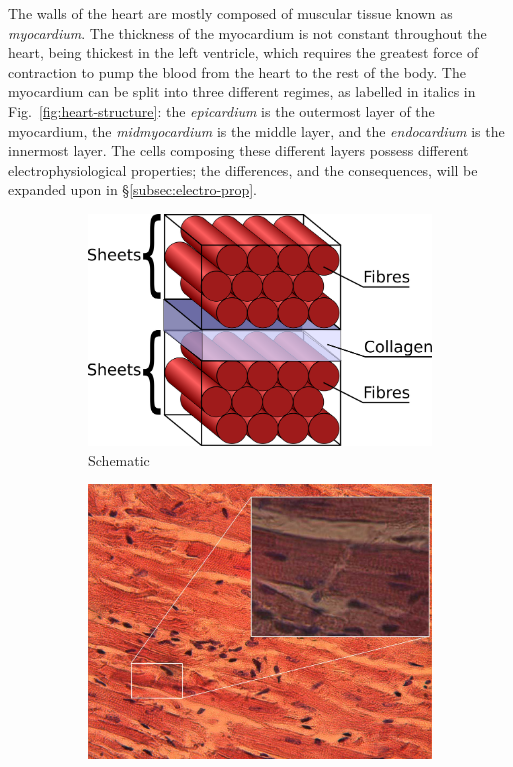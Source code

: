 \documentclass[../thesis-main.tex]{subfiles}
\begin{document}
 The walls of the heart are mostly composed of muscular tissue known as \emph{myocardium}. The thickness of the myocardium is not constant throughout the heart, being thickest in the left ventricle, which requires the greatest force of contraction to pump the blood from the heart to the rest of the body. The myocardium can be split into three different regimes, as labelled in italics in Fig.~\ref{fig:heart-structure}: the \emph{epicardium} is the outermost layer of the myocardium, the \emph{midmyocardium} is the middle layer, and the \emph{endocardium} is the innermost layer. The cells composing these different layers possess different electrophysiological properties; the differences, and the consequences, will be expanded upon in \S\ref{subsec:electro-prop}.
 
 \begin{figure}
  \centering
  \begin{subfigure}[b]{0.45\textwidth}
   \centering
   \includegraphics[width=\textwidth]{myocytes}
   \caption{Schematic}
   \label{subfig:myocyte-diagram}
  \end{subfigure}
  \begin{subfigure}[b]{0.45\textwidth}
   \centering
   \includegraphics[width=\textwidth]{myocyte-image}

\end{subfigure}
\end{figure}
\end{document}
